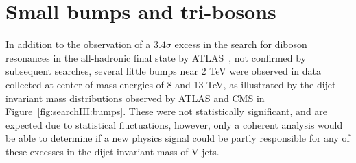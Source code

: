 \newcommand{\MassExclWPr}{3.8\xspace} %
\newcommand{\MassExclZPr}{3.5\xspace}
\newcommand{\BulkGMassMin}{1.2\xspace}
\newcommand{\BulkGMassMinXsec}{27\xspace} %
\newcommand{\BulkGMassMax}{5.2\xspace}
\newcommand{\BulkGMassMaxXsec}{0.2\xspace} %
\newcommand{\BulkGWWMassMinXsec}{20\xspace} %
\newcommand{\BulkGWWMassMaxXsec}{0.2\xspace}
\newcommand{\BulkGZZMassMinXsec}{27\xspace} %
\newcommand{\BulkGZZMassMaxXsec}{0.2\xspace}
\section{Small bumps and tri-bosons}
In addition to the observation of a $3.4 \sigma$ excess in the search for diboson resonances in the all-hadronic final state by ATLAS~\cite{Aad2015}, not confirmed by subsequent searches, several little bumps near 2 TeV were observed in data collected at center-of-mass energies of 8 and 13 TeV, as illustrated by the dijet invariant mass distributions observed by ATLAS and CMS in Figure~\ref{fig:searchIII:bumps}. These were not statistically significant, and are expected due to statistical fluctuations, however, only a coherent analysis would be able to determine if a new physics signal could be partly responsible for any of these excesses in the dijet invariant mass of V jets.

